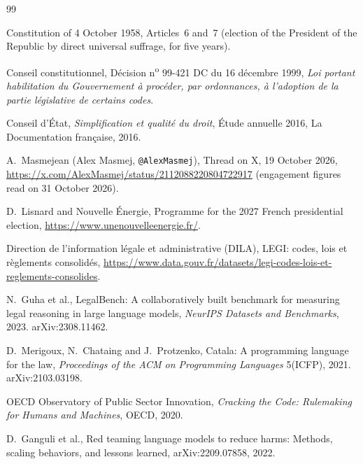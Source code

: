 \documentclass[11pt,a4paper]{article}
\begin{document}
\begin{thebibliography}{99}

Constitution of 4 October 1958, Articles~6 and~7 (election of the President of the Republic by direct universal suffrage, for five years).

Conseil constitutionnel,
Décision n\textsuperscript{o} 99-421 DC du 16 décembre 1999, \emph{Loi portant habilitation du Gouvernement à procéder, par ordonnances, à l'adoption de la partie législative de certains codes}.

Conseil d'État,
\emph{Simplification et qualité du droit}, Étude annuelle 2016, La Documentation française, 2016.

A.~Masmejean (Alex Masmej, \texttt{@AlexMasmej}),
Thread on X, 19 October 2026,
\url{https://x.com/AlexMasmej/status/2112088220804722917} (engagement figures read on 31 October 2026).

D.~Lisnard and Nouvelle Énergie,
Programme for the 2027 French presidential election,
\url{https://www.unenouvelleenergie.fr/}.

Direction de l'information légale et administrative (DILA),
LEGI: codes, lois et règlements consolidés,
\url{https://www.data.gouv.fr/datasets/legi-codes-lois-et-reglements-consolides}.

N.~Guha et al.,
LegalBench: A collaboratively built benchmark for measuring legal reasoning in large language models,
\emph{NeurIPS Datasets and Benchmarks}, 2023. arXiv:2308.11462.

D.~Merigoux, N.~Chataing and J.~Protzenko,
Catala: A programming language for the law,
\emph{Proceedings of the ACM on Programming Languages} 5(ICFP), 2021. arXiv:2103.03198.

OECD Observatory of Public Sector Innovation,
\emph{Cracking the Code: Rulemaking for Humans and Machines}, OECD, 2020.

D.~Ganguli et al.,
Red teaming language models to reduce harms: Methods, scaling behaviors, and lessons learned,
arXiv:2209.07858, 2022.

\end{thebibliography}
\end{document}
